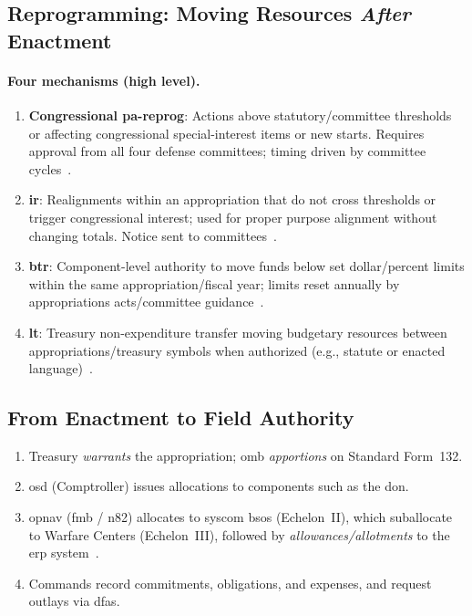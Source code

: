\documentclass[../main.tex]{subfiles}
\begin{document}
\subsection{Reprogramming: Moving Resources \emph{After} Enactment}
\paragraph*{Four mechanisms (high level).}
\begin{enumerate}
	\item \textbf{Congressional \ac{pa-reprog}}: Actions above statutory/committee thresholds or affecting congressional special-interest items or new starts. Requires approval from all four defense committees; timing driven by committee cycles~\autocite{DoDFMR-Vol3}.
	\item \textbf{\ac{ir}}: Realignments within an appropriation that do not cross thresholds or trigger congressional interest; used for proper purpose alignment without changing totals. Notice sent to committees~\autocite{DoDFMR-Vol3}.
	\item \textbf{\ac{btr}}: Component-level authority to move funds below set dollar/percent limits within the same appropriation/fiscal year; limits reset annually by appropriations acts/committee guidance~\autocite{DoDFMR-Vol3}.
	\item \textbf{\ac{lt}}: Treasury non-expenditure transfer moving budgetary resources between appropriations/treasury symbols when authorized (e.g., statute or enacted language)~\autocite{DoDFMR-Vol3}.
\end{enumerate}

\subsection{From Enactment to Field Authority}
\begin{enumerate}
	\item Treasury \emph{warrants} the appropriation; \ac{omb} \emph{apportions} on Standard Form~132.
	\item \ac{osd} (Comptroller) issues allocations to components such as the \ac{don}.
	\item \ac{opnav} (\ac{fmb} / \ac{n82}) allocates to \ac{syscom} \acp{bso} (Echelon~II), which suballocate to Warfare Centers (Echelon~III), followed by \emph{allowances/allotments} to the \ac{erp} system~\autocite{DoDFMR-Vol3}.
	\item Commands record commitments, obligations, and expenses, and request outlays via \ac{dfas}.
\end{enumerate}
\end{document}
